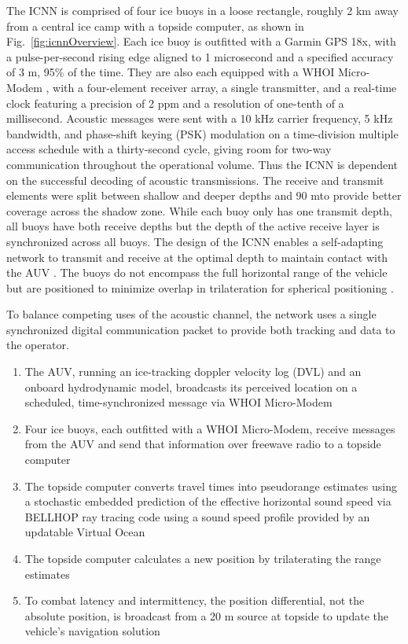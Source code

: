 \documentclass[preprint,TurnOnLineNumbers]{JASA}
\newcommand{\llabel}[1]{\hypertarget{llineno:#1}{\linelabel{#1}}}
\begin{document}
The ICNN is comprised of four ice buoys in a loose rectangle, roughly 2 km away from a central ice camp with a topside computer, as shown in Fig.~\ref{fig:icnnOverview}.
Each ice buoy is outfitted with a Garmin GPS 18x, with a pulse-per-second rising edge aligned to 1 microsecond and a specified accuracy of 3 m, 95\% of the time.
They are also each equipped with a WHOI Micro-Modem \citep{Singh2006,gallimore2010whoi}, with a four-element receiver array, a single transmitter, and a real-time clock featuring a precision of 2 ppm and a resolution of one-tenth of a millisecond.
\llabel{1.6a} Acoustic messages were sent with a 10 kHz carrier frequency, 5 kHz bandwidth, and phase-shift keying (PSK) modulation on a time-division multiple access schedule with a thirty-second cycle, giving room for two-way communication throughout the operational volume.
Thus the ICNN is dependent on the successful decoding of acoustic transmissions.
The receive and transmit elements were split between shallow and deeper depths and 90 m\textemdash to provide better coverage across the shadow zone.
While each buoy only has one transmit depth, all buoys have both receive depths but the depth of the active receive layer is synchronized across all buoys. \llabel{1.12}
The design of the ICNN enables a self-adapting network to transmit and receive at the optimal depth to maintain contact with the AUV \citep{schneider_self-adapting_2020}.
The buoys do not encompass the full horizontal range of the vehicle but are positioned to minimize overlap in trilateration for spherical positioning \citep{deffenbaugh1996posit}.

To balance competing uses of the acoustic channel, the network uses a single synchronized digital communication packet to provide both tracking and data to the operator.
\begin{enumerate}
\item The AUV, running an ice-tracking doppler velocity log (DVL) and an onboard hydrodynamic model, broadcasts its perceived location on a scheduled, time-synchronized message via WHOI Micro-Modem
\item Four ice buoys, each outfitted with a WHOI Micro-Modem, receive messages from the AUV and send that information over freewave radio to a topside computer
\item The topside computer converts travel times into pseudorange estimates using a stochastic embedded prediction of the effective horizontal sound speed via BELLHOP ray tracing code \citep{Porter2011} using a sound speed profile provided by an updatable Virtual Ocean \citep{schneider_netsim_2018,bhatt_embedded_2022}
\item The topside computer calculates a new position by trilaterating the range estimates
\item To combat latency and intermittency, the position differential, not the absolute position, is broadcast from a 20 m source at topside to update the vehicle's navigation solution
\end{enumerate}
\end{document}
